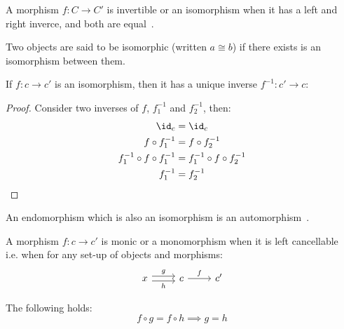\begin{definition}[Isomorphism]
  A morphism $f: C\to C'$ is invertible or an isomorphism when it has a left and
  right inverce, and both are
  equal~\parencite[p.~19]{lane:working_mathematician}.
\end{definition}

\begin{remark}
  Two objects are said to be isomorphic (written $a\cong b$) if there exists is
  an isomorphism between them.
\end{remark}

\begin{theorem}
  If $f: c\to c'$ is an isomorphism, then it has a unique inverse $f^{-1}:c'\to
  c$:
  \begin{proof}
    Consider two inverses of $f$, $f^{-1}_1$ and $f^{-1}_2$, then:
    \[
      \begin{aligned}
        \id_c &= \id_c\\
        f\circ f^{-1}_1 &= f\circ f^{-1}_2\\
        f^{-1}_1 \circ f \circ f^{-1}_1 &= f^{-1}_1 \circ f \circ f^{-1}_2\\
        f^{-1}_1 &= f^{-1}_2
      \end{aligned}
    \]
  \end{proof}
\end{theorem}

\begin{definition}[Automorphism]
  An endomorphism which is also an isomorphism is an
  automorphism~\parencite[p.~7]{riehl:category_theory_in_context}.
\end{definition}

\begin{definition}[Monomorphisms]
  A morphism $f:c\to c'$ is monic or a monomorphism when it is left
  cancellable~\parencite[p.~19]{lane:working_mathematician} i.e. when for any
  set-up of objects and morphisms:
  \[\begin{tikzcd}[ampersand replacement=\&]
    x \& c \& {c'}
    \arrow["f", from=1-2, to=1-3]
    \arrow["g", shift left=1, from=1-1, to=1-2]
    \arrow["h"', shift right=1, from=1-1, to=1-2]
  \end{tikzcd}\]

  The following holds:
  \[f \circ g = f \circ h \implies g = h\]
\end{definition}

